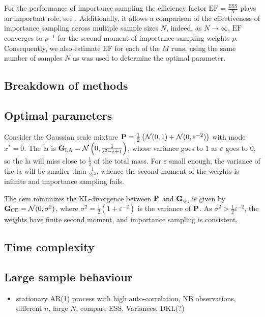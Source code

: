 \begin{example}
    For the performance of importance sampling the efficiency factor $ \text{EF} = \frac{\text{ESS}}{N}$ plays an important role, see . Additionally, it allows a comparison of the effectiveness of importance sampling across multiple sample sizes $N$, indeed, as $N\to\infty$, $\text{EF}$ converges to $ \rho^{-1}$ for the second moment of importance sampling weights $\rho$.
    Consequently, we also estimate $\text{EF}$ for each of the $M$ runs, using the same number of samples $N$ as was used to determine the optimal parameter.
    
\end{example}

\subsection{Breakdown of methods}

\subsection{Optimal parameters}

\begin{example}
  \label{ex:la_failure}
  Consider the Gaussian scale mixture $\P = \frac{1}{2} \left(\mathcal N (0,1) + \mathcal N(0, \varepsilon^{-2})\right)$ with mode $x^{\ast}=0$. 
  The \gls{la} is $\G_{\text{LA}} = \mathcal N \left( 0, \frac{1}{\varepsilon^{2} - \varepsilon + 1} \right)$, whose variance goes to $1$ as $\varepsilon$ goes to $0$, so the \gls{la} will miss close to $\frac 1 2$ of the total mass.
  For $\varepsilon$ small enough, the variance of the \gls{la} will be smaller than $\frac{1}{2\varepsilon^{2}}$, whence the second moment of the weights is infinite and importance sampling fails.

  The \gls{cem} minimizes the KL-divergence between $\P$ and $\G_{\psi}$, is given by $\G_{\text{CE}} = \mathcal N (0, \sigma^{2})$, where $\sigma^{2} = \frac{1}{2}\left( 1 + \varepsilon^{-2} \right)$ is the variance of $\P$.
  As $\sigma^{2} > \frac{1}{2}\varepsilon^{-2}$, the weights have finite second moment, and importance sampling is consistent.
\end{example}

\subsection{Time complexity}

\subsection{Large sample behaviour}

\begin{itemize}
    \item stationary AR(1) process with high auto-correlation, NB observations, different $n$, large $N$, compare ESS, Variances, DKL(?)
\end{itemize}
